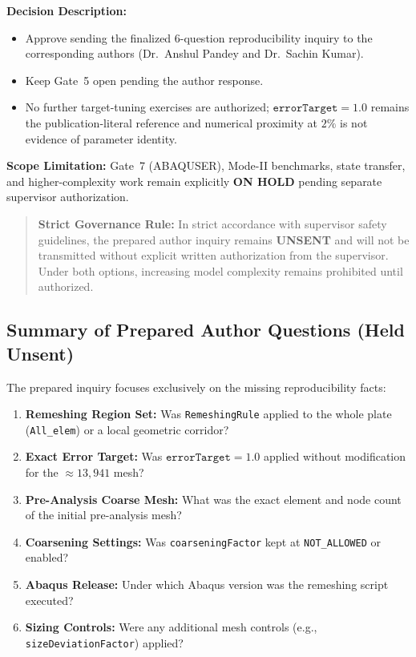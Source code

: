 \vspace{0.2em}

\begin{tcolorbox}[colback=orange!4!white,colframe=orange!85!black,title=\textbf{Option B: Authorize Transmission of Author Reproducibility Inquiry},top=1.5pt,bottom=1.5pt,left=3pt,right=3pt]
\textbf{Decision Description:}
\begin{itemize}[leftmargin=4mm,itemsep=0.5pt,topsep=1pt]
  \item Approve sending the finalized 6-question reproducibility inquiry to the corresponding authors (Dr.~Anshul Pandey and Dr.~Sachin Kumar).
  \item Keep Gate~5 open pending the author response.
  \item No further target-tuning exercises are authorized; $\texttt{errorTarget}=1.0$ remains the publication-literal reference and numerical proximity at $2\%$ is not evidence of parameter identity.
\end{itemize}
\textbf{Scope Limitation:} Gate~7 (ABAQUSER), Mode-II benchmarks, state transfer, and higher-complexity work remain explicitly \textbf{ON HOLD} pending separate supervisor authorization.
\end{tcolorbox}

\begin{quote}
\textbf{Strict Governance Rule:} In strict accordance with supervisor safety guidelines, the prepared author inquiry remains \textbf{UNSENT} and will not be transmitted without explicit written authorization from the supervisor. Under both options, increasing model complexity remains prohibited until authorized.
\end{quote}

\subsection{Summary of Prepared Author Questions (Held Unsent)}
The prepared inquiry focuses exclusively on the missing reproducibility facts:
\begin{enumerate}[leftmargin=4mm,itemsep=0.5pt,topsep=1pt]
  \item \textbf{Remeshing Region Set:} Was \texttt{RemeshingRule} applied to the whole plate (\texttt{All\_elem}) or a local geometric corridor?
  \item \textbf{Exact Error Target:} Was $\texttt{errorTarget}=1.0$ applied without modification for the $\approx 13{,}941$ mesh?
  \item \textbf{Pre-Analysis Coarse Mesh:} What was the exact element and node count of the initial pre-analysis mesh?
  \item \textbf{Coarsening Settings:} Was \texttt{coarseningFactor} kept at \texttt{NOT\_ALLOWED} or enabled?
  \item \textbf{Abaqus Release:} Under which Abaqus version was the remeshing script executed?
  \item \textbf{Sizing Controls:} Were any additional mesh controls (e.g., \texttt{sizeDeviationFactor}) applied?
\end{enumerate}
